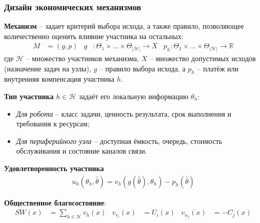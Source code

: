 \begin{frame}
	\frametitle{Дизайн экономических механизмов}
	\small
	\textbf{Механизм} -- задает критерий выбора исхода, а также правило, позволяющее количественно оценить влияние участника на остальных:
	\begin{align*}
		M &= (g,p) &
		g &: \Theta_1 \times \ldots \times \Theta_{|\mathcal{H}|} \rightarrow X & p_h : \Theta_1 \times \ldots \times \Theta_{|\mathcal{H}|} \rightarrow \mathbb{R}
	\end{align*}
	где $\mathcal{H}$ -- множество участников механизма, $X$ -- множество допустимых исходов (назначение задач на узлы), $g$ -- правило выбора исхода, а $p_h$ -- платёж или внутренняя компенсация участника $h$.

	\textbf{Тип участника} $h \in \mathcal{H}$ задаёт его локальную информацию $\theta_h$:
	\begin{itemize}
		\item \textit{Для робота} -- класс задачи, ценность результата, срок выполнения и требования к ресурсам;
		\item \textit{Для периферийного узла} -- доступная ёмкость, очередь, стоимость обслуживания и состояние каналов связи.
	\end{itemize}

	\textbf{Удовлетворенность участника}
	\begin{align*}
		u_h(\theta_h,\widehat{\theta}) = v_h(g(\widehat{\theta}),\theta_h) - p_h(\widehat{\theta})
	\end{align*}

	\textbf{Общественное благосостояние}:
	\begin{align*}
		SW(x) &= \sum_{h \in \mathcal{H}} v_h(x) & v_{r_i}(x) &= U_i(x) & v_{n_j}(x) &= - C_j(x)
	\end{align*}
\end{frame}

